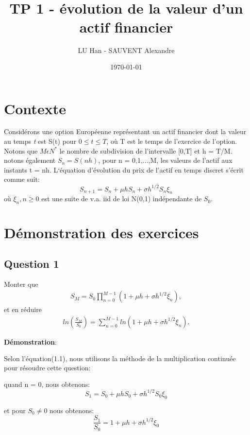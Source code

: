 \documentclass[a4paper,10pt]{report}
\title{TP 1 - évolution de la valeur d'un actif financier}
\author{LU Han - SAUVENT Alexandre}
\date{\today}
\begin{document}
\renewcommand{\labelitemi}{\large\textcolor{tatoebagreen}{\fg}}
\groovypdtitre
\restoregeometry %


\tableofcontents


\chapter{Contexte}
\noindent Considérons une option Européenne représentant un actif financier dont la valeur au temps \emph{t} est S(t) pour $0 \leq t \leq T$, où T est le temps de l'exercice de l'option. Notons que $M \epsilon N^{\ast}$ le nombre de subdivision de l'intervalle [0,T] et h = T/M. notons également $S_{n} = S(nh)$, pour n = 0,1,...,M, les valeurs de l'actif aux instants t = nh.
L‘équation d'évolution du prix de l'actif en temps discret s'écrit comme suit:
\begin{equation}
S_{n+1} = S_{n} + \mu h S_{n} + \sigma h^{1/2} S_{n} \xi_{n}   
\end{equation} 
où $\xi_{n}, n \geq 0$ est une suite de v.a. iid de loi N(0,1) indépendante de $S_{0}$. 

\chapter{Démonstration des exercices}
\section{Question 1}
\noindent Monter que 
\begin{align*}
	S_{M} = S_{0} \prod_{n=0}^{M-1} (1 + \mu h + \sigma h^{1/2} \xi_{n}),
\end{align*}
\noindent et en réduire
\begin{align*}
	ln(\frac{S_{M}}{S_{0}}) = \sum_{n=0}^{M-1} ln(1  + \mu h + \sigma h^{1/2} \xi_{n}).
\end{align*}

\noindent \textbf{Démonstration}:
\par Selon l'équation(1.1), nous utilisons la méthode de la multiplication continuée pour résoudre cette question:
\par quand n = 0, nous obtenons:
\begin{equation}
	S_{1} = S_{0} + \mu h S_{0} + \sigma h^{1/2} S_{0} \xi_{0}
\end{equation} 
\par et pour $S_{0} \neq 0$ nous obtenons:
\begin{equation}
\frac{S_{1}}{S_{0}} = 1 + \mu h + \sigma h^{1/2} \xi_{0}
\end{equation} 
\end{document}
